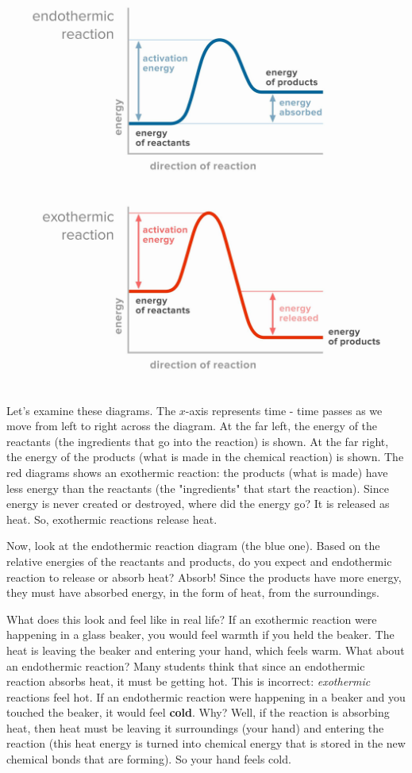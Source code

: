 \begin{center}
\includegraphics[scale=0.15]{exo_endo_diagrams.png}
\end{center}

Let's examine these diagrams. The $x$-axis represents time - time passes as we
move from left to right across the diagram. At the far left, the energy of the
reactants (the ingredients that go into the reaction) is shown. At the far
right, the energy of the products (what is made in the chemical reaction) is
shown. The red diagrams shows an exothermic reaction: the products (what is
made) have less energy than the reactants (the "ingredients" that start the
reaction). Since energy is never created or destroyed, where did the energy go?
It is released as heat. So, exothermic reactions release heat.

Now, look at the endothermic reaction diagram (the blue one). Based on the
relative energies of the reactants and products, do you expect and endothermic
reaction to release or absorb heat? Absorb! Since the products have more
energy, they must have absorbed energy, in the form of heat, from the surroundings.

What does this look and feel like in real life? If an exothermic reaction were
happening in a glass beaker, you would feel warmth if you held the beaker. The
heat is leaving the beaker and entering your hand, which feels warm. What
about an endothermic reaction? Many students think that since an endothermic
reaction absorbs heat, it must be getting hot. This is incorrect:
\textit{exothermic} reactions feel hot. If an endothermic reaction were
happening in a beaker and you touched the beaker, it would feel \textbf{cold}.
Why? Well, if the reaction is absorbing heat, then heat must be leaving it
surroundings (your hand) and entering the reaction (this heat energy is turned
into chemical energy that is stored in the new chemical bonds that are
forming). So your hand feels cold. %

